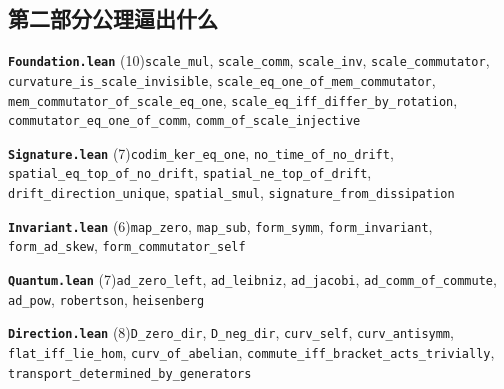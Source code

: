 \documentclass[11pt,a4paper]{article}
\theoremstyle{sudef}
\begin{document}
\subsection*{第二部分\quad 公理逼出什么}
\noindent\textbf{\texttt{Foundation.lean}} (10)\quad \texttt{scale\_\allowbreak mul}, \texttt{scale\_\allowbreak comm}, \texttt{scale\_\allowbreak inv}, \texttt{scale\_\allowbreak commutator}, \texttt{curvature\_\allowbreak is\_\allowbreak scale\_\allowbreak invisible}, \texttt{scale\_\allowbreak eq\_\allowbreak one\_\allowbreak of\_\allowbreak mem\_\allowbreak commutator}, \texttt{mem\_\allowbreak commutator\_\allowbreak of\_\allowbreak scale\_\allowbreak eq\_\allowbreak one}, \texttt{scale\_\allowbreak eq\_\allowbreak iff\_\allowbreak differ\_\allowbreak by\_\allowbreak rotation}, \texttt{commutator\_\allowbreak eq\_\allowbreak one\_\allowbreak of\_\allowbreak comm}, \texttt{comm\_\allowbreak of\_\allowbreak scale\_\allowbreak injective}\par\smallskip
\noindent\textbf{\texttt{Signature.lean}} (7)\quad \texttt{codim\_\allowbreak ker\_\allowbreak eq\_\allowbreak one}, \texttt{no\_\allowbreak time\_\allowbreak of\_\allowbreak no\_\allowbreak drift}, \texttt{spatial\_\allowbreak eq\_\allowbreak top\_\allowbreak of\_\allowbreak no\_\allowbreak drift}, \texttt{spatial\_\allowbreak ne\_\allowbreak top\_\allowbreak of\_\allowbreak drift}, \texttt{drift\_\allowbreak direction\_\allowbreak unique}, \texttt{spatial\_\allowbreak smul}, \texttt{signature\_\allowbreak from\_\allowbreak dissipation}\par\smallskip
\noindent\textbf{\texttt{Invariant.lean}} (6)\quad \texttt{map\_\allowbreak zero}, \texttt{map\_\allowbreak sub}, \texttt{form\_\allowbreak symm}, \texttt{form\_\allowbreak invariant}, \texttt{form\_\allowbreak ad\_\allowbreak skew}, \texttt{form\_\allowbreak commutator\_\allowbreak self}\par\smallskip
\noindent\textbf{\texttt{Quantum.lean}} (7)\quad \texttt{ad\_\allowbreak zero\_\allowbreak left}, \texttt{ad\_\allowbreak leibniz}, \texttt{ad\_\allowbreak jacobi}, \texttt{ad\_\allowbreak comm\_\allowbreak of\_\allowbreak commute}, \texttt{ad\_\allowbreak pow}, \texttt{robertson}, \texttt{heisenberg}\par\smallskip
\noindent\textbf{\texttt{Direction.lean}} (8)\quad \texttt{D\_\allowbreak zero\_\allowbreak dir}, \texttt{D\_\allowbreak neg\_\allowbreak dir}, \texttt{curv\_\allowbreak self}, \texttt{curv\_\allowbreak antisymm}, \texttt{flat\_\allowbreak iff\_\allowbreak lie\_\allowbreak hom}, \texttt{curv\_\allowbreak of\_\allowbreak abelian}, \texttt{commute\_\allowbreak iff\_\allowbreak bracket\_\allowbreak acts\_\allowbreak trivially}, \texttt{transport\_\allowbreak determined\_\allowbreak by\_\allowbreak generators}\par\smallskip
\end{document}
